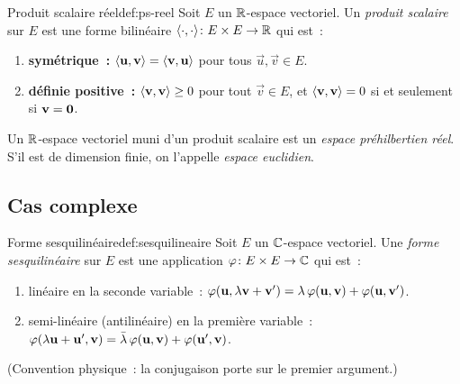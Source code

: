 \begin{definition}{Produit scalaire réel}{def:ps-reel}
  Soit $E$ un ${\mathbb{R}}$-espace vectoriel. Un \emph{produit scalaire} sur $E$
  est une forme bilinéaire $\langle\cdot,\cdot\rangle\colon E\times E\to{\mathbb{R}}$
  qui est~:
  \begin{enumerate}[label=(\roman*)]
    \item \textbf{symétrique~:} $\langle\mathbf{u},\mathbf{v}\rangle
      =\langle\mathbf{v},\mathbf{u}\rangle$ pour tous $\vec{u},\vec{v}\in E$.
    \item \textbf{définie positive~:} $\langle\mathbf{v},\mathbf{v}\rangle\geq 0$
      pour tout $\vec{v}\in E$, et $\langle\mathbf{v},\mathbf{v}\rangle=0$ si et
      seulement si $\mathbf{v}=\mathbf{0}$.
  \end{enumerate}
  Un ${\mathbb{R}}$-espace vectoriel muni d'un produit scalaire est un
  \emph{espace préhilbertien réel}. S'il est de dimension finie, on
  l'appelle \emph{espace euclidien}.
\end{definition}

\subsection{Cas complexe}\label{subsec:ps-complexe}

\begin{definition}{Forme sesquilinéaire}{def:sesquilineaire}
  Soit $E$ un ${\mathbb{C}}$-espace vectoriel. Une \emph{forme sesquilinéaire}
  sur $E$ est une application $\varphi\colon E\times E\to{\mathbb{C}}$ qui est~:
  \begin{enumerate}[label=(\roman*)]
    \item linéaire en la seconde variable~:
      $\varphi(\mathbf{u},\lambda\mathbf{v}+\mathbf{v}')
      =\lambda\,\varphi(\mathbf{u},\mathbf{v})+\varphi(\mathbf{u},\mathbf{v}')$.
    \item semi-linéaire (antilinéaire) en la première variable~:
      $\varphi(\lambda\mathbf{u}+\mathbf{u}',\mathbf{v})
      =\bar{\lambda}\,\varphi(\mathbf{u},\mathbf{v})+\varphi(\mathbf{u}',\mathbf{v})$.
  \end{enumerate}
  (Convention physique~: la conjugaison porte sur le premier argument.)
\end{definition}

